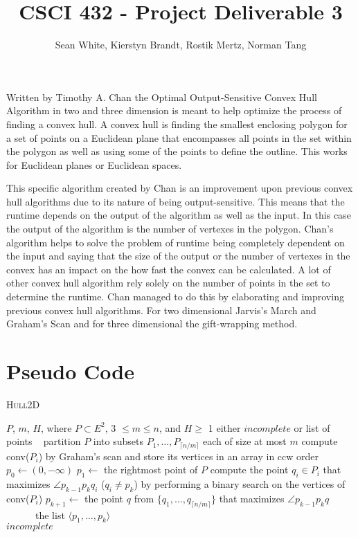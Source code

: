 \documentclass[12pt]{article}
\author{Sean White, Kierstyn Brandt, Rostik Mertz, Norman Tang}
\title{CSCI 432 - Project Deliverable 3}
\begin{document}
\maketitle

Written by Timothy A. Chan the Optimal Output-Sensitive Convex Hull Algorithm in two and three dimension is meant to help optimize the process of finding a convex hull. A convex hull is finding the smallest enclosing polygon for a set of points on a Euclidean plane that encompasses all points in the set within the polygon as well as using some of the points to define the outline. This works for Euclidean planes or Euclidean spaces. 

This specific algorithm created by Chan is an improvement upon previous convex hull algorithms due to its nature of being output-sensitive. This means that the runtime depends on the output of the algorithm as well as the input. In this case the output of the algorithm is the number of vertexes in the polygon. Chan's algorithm helps to solve the problem of runtime being completely dependent on the input and saying that the size of the output or the number of vertexes in the convex has an impact on the how fast the convex can be calculated. A lot of other convex hull algorithm rely solely on the number of points in the set to determine the runtime. Chan managed to do this by elaborating and improving previous convex hull algorithms. For two dimensional Jarvis's March and Graham's Scan and for three dimensional the gift-wrapping method. 

\section*{Pseudo Code}
\begin{algorithm}\caption{\textsc{Hull2D}}\label{alg:2D}
\begin{algorithmic}[1]
 $P$, $m$, $H$, where $P\subset E^2$, 3 $\leq m \leq n$, and $H\geq$ 1
 either $incomplete$ or list of points
\State ~
\State partition $P$ into subsets $P_1,\dots , P_{\lceil n/m \rceil}$ each of size at most $m$
	\State compute conv($P_i$) by Graham's scan and store its vertices in an array in ccw order
\EndFor
\State $p_0 \gets (0,-\infty)$
\State $p_1 \gets$ the rightmost point of $P$
\State compute the point $q_i \in P_i$ that maximizes $\angle p_{k-1}p_kq_i$ ($q_i \neq p_k$) by performing a binary search on the vertices of conv($P_i$)
\EndFor
\State $p_{k+1} \gets$ the point $q$ from $\{q_1, \dots, q_{\lceil n/m \rceil}\}$ that maximizes $\angle p_{k-1}p_kq$
\\
~~~~~~\Return the list $\langle p_1, \dots ,p_k \rangle$
\EndIf
\EndFor\\
\Return $incomplete$
 \end{algorithmic}
\end{algorithm}
\end{document}
